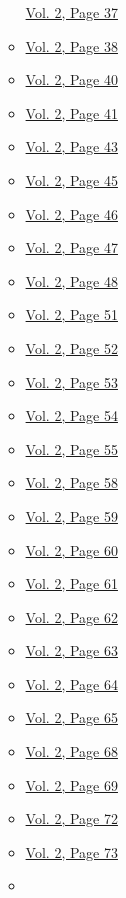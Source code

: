 \begin{itemize}
\begin{itemize}
    \protect\hyperlink{g-page-249}{Vol. 2, Page 37}
  \item
    \protect\hyperlink{g-page-250}{Vol. 2, Page 38}
  \item
    \protect\hyperlink{g-page-252}{Vol. 2, Page 40}
  \item
    \protect\hyperlink{g-page-253}{Vol. 2, Page 41}
  \item
    \protect\hyperlink{g-page-255}{Vol. 2, Page 43}
  \item
    \protect\hyperlink{g-page-257}{Vol. 2, Page 45}
  \item
    \protect\hyperlink{g-page-258}{Vol. 2, Page 46}
  \item
    \protect\hyperlink{g-page-259}{Vol. 2, Page 47}
  \item
    \protect\hyperlink{g-page-260}{Vol. 2, Page 48}
  \item
    \protect\hyperlink{g-page-263}{Vol. 2, Page 51}
  \item
    \protect\hyperlink{g-page-264}{Vol. 2, Page 52}
  \item
    \protect\hyperlink{g-page-265}{Vol. 2, Page 53}
  \item
    \protect\hyperlink{g-page-266}{Vol. 2, Page 54}
  \item
    \protect\hyperlink{g-page-267}{Vol. 2, Page 55}
  \item
    \protect\hyperlink{g-page-270}{Vol. 2, Page 58}
  \item
    \protect\hyperlink{g-page-271}{Vol. 2, Page 59}
  \item
    \protect\hyperlink{g-page-272}{Vol. 2, Page 60}
  \item
    \protect\hyperlink{g-page-273}{Vol. 2, Page 61}
  \item
    \protect\hyperlink{g-page-274}{Vol. 2, Page 62}
  \item
    \protect\hyperlink{g-page-275}{Vol. 2, Page 63}
  \item
    \protect\hyperlink{g-page-276}{Vol. 2, Page 64}
  \item
    \protect\hyperlink{g-page-277}{Vol. 2, Page 65}
  \item
    \protect\hyperlink{g-page-280}{Vol. 2, Page 68}
  \item
    \protect\hyperlink{g-page-281}{Vol. 2, Page 69}
  \item
    \protect\hyperlink{g-page-284}{Vol. 2, Page 72}
  \item
    \protect\hyperlink{g-page-285}{Vol. 2, Page 73}
  \item

\end{itemize}
\end{itemize}
